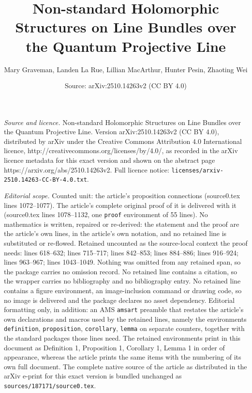 \documentclass[10pt,a4paper]{amsart}
\title{Non-standard Holomorphic Structures on Line Bundles over the Quantum Projective Line}
\author{Mary Graveman, Landen La Rue, Lillian MacArthur, Hunter Pesin, Zhaoting Wei}
\date{Source: arXiv:2510.14263v2 (CC BY 4.0)}
\begin{document}
\maketitle

\noindent\emph{Source and licence.} Non-standard Holomorphic Structures on Line Bundles over the Quantum Projective Line. Version arXiv:2510.14263v2 (CC BY 4.0), distributed by arXiv under the Creative Commons Attribution 4.0 International licence, http://creativecommons.org/licenses/by/4.0/, as recorded in the arXiv licence metadata for this exact version and shown on the abstract page https://arxiv.org/abs/2510.14263v2. Full licence notice: \texttt{licenses/arxiv-2510.14263-CC-BY-4.0.txt}.\par\smallskip

\noindent\textit{Editorial scope.} Counted unit: the article's proposition connections (source0.tex lines 1072--1077). The article's complete original proof of it is delivered with it (source0.tex lines 1078--1132, one \texttt{proof} environment of 55 lines). No mathematics is written, repaired or re-derived: the statement and the proof are the article's own lines, in the article's own notation, and no retained line is substituted or re-flowed.  Retained uncounted as the source-local context the proof needs: lines 618--632; lines 715--717; lines 842--853; lines 884--886; lines 916--924; lines 963--967; lines 1043--1049.  Nothing was omitted from any retained span, so the package carries no omission record.  No retained line contains a citation, so the wrapper carries no bibliography and no bibliography entry.  No retained line contains a figure environment, an image-inclusion command or drawing code, so no image is delivered and the package declares no asset dependency.  Editorial formatting only, in addition: an AMS \texttt{amsart} preamble that restates the article's own declarations and macros used by the retained lines, namely the environments \texttt{definition}, \texttt{proposition}, \texttt{corollary}, \texttt{lemma} on separate counters, together with the standard packages those lines need.  The retained environments print in this document as Definition 1, Proposition 1, Corollary 1, Lemma 1 in order of appearance, whereas the article prints the same items with the numbering of its own full document.  The complete native source of the article as distributed in the arXiv e-print for this exact version is bundled unchanged as \texttt{sources/187171/source0.tex}.
\end{document}
